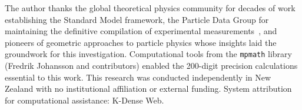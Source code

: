 \documentclass[11pt,a4paper]{article}
\begin{document}
The author thanks the global theoretical physics community for decades of work establishing the Standard Model framework, the Particle Data Group for maintaining the definitive compilation of experimental measurements~\cite{ref007}, and pioneers of geometric approaches to particle physics whose insights laid the groundwork for this investigation. Computational tools from the \texttt{mpmath} library (Fredrik Johansson and contributors) enabled the 200-digit precision calculations essential to this work. This research was conducted independently in New Zealand with no institutional affiliation or external funding. System attribution for computational assistance: K-Dense Web.



\end{document}
